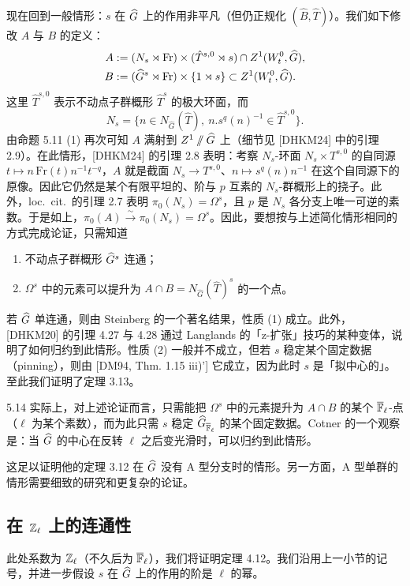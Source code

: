 现在回到一般情形：$s$ 在 $\widehat{G}$ 上的作用非平凡（但仍正规化 $(\hat B,\hat T)$）。我们如下修改 $A$ 与 $B$ 的定义：
\begin{align*}
A&:=(N_s\rtimes\mathrm{Fr})\times(\hat T^{s,0}\rtimes s)\cap Z^1(W_t^0,\widehat{G}),\\
B&:=(\widehat{G}^s\rtimes\mathrm{Fr})\times\{1\rtimes s\}\subset Z^1(W_t^0,\widehat{G}).
\end{align*}
这里 $\hat T^{s,0}$ 表示不动点子群概形 $\hat T^s$ 的极大环面，而
\[
N_s=\{n\in N_{\hat G}(\hat T),\ n.s^q(n)^{-1}\in\hat T^{s,0}\}.
\]
由命题 5.11 (1) 再次可知 $A$ 满射到 $Z^1\sslash\widehat{G}$ 上（细节见 [DHKM24] 中的引理 2.9）。在此情形，[DHKM24] 的引理 2.8 表明：考察 $N_s$-环面 $N_s\times T^{s,0}$ 的自同源 $t\mapsto n\,\mathrm{Fr}(t)n^{-1}t^{-q}$，$A$ 就是截面 $N_s\to T^{s,0}$、$n\mapsto s^q(n)n^{-1}$ 在这个自同源下的原像。因此它仍然是某个有限平坦的、阶与 $p$ 互素的 $N_s$-群概形上的挠子。此外，loc.\ cit.\ 的引理 2.7 表明 $\pi_0(N_s)=\Omega^s$，且 $p$ 是 $N_s$ 各分支上唯一可逆的素数。于是如上，$\pi_0(A)\xrightarrow{\sim}\pi_0(N_s)=\Omega^s$。因此，要想按与上述简化情形相同的方式完成论证，只需知道
\begin{enumerate}[leftmargin=2.2em,itemsep=0.1em,topsep=0.2em]
\item 不动点子群概形 $\widehat{G}^s$ 连通；
\item $\Omega^s$ 中的元素可以提升为 $A\cap B=N_{\hat G}(\hat T)^s$ 的一个点。
\end{enumerate}
若 $\widehat{G}$ 单连通，则由 Steinberg 的一个著名结果，性质 (1) 成立。此外，[DHKM20] 的引理 4.27 与 4.28 通过 Langlands 的「z-扩张」技巧的某种变体，说明了如何归约到此情形。性质 (2) 一般并不成立，但若 $s$ 稳定某个固定数据（pinning），则由 [DM94, Thm. 1.15 iii)'] 它成立，因为此时 $s$ 是「拟中心的」。至此我们证明了定理 3.13。

\begin{rem}{5.14}
实际上，对上述论证而言，只需能把 $\Omega^s$ 中的元素提升为 $A\cap B$ 的某个 $\overline{\mathbb{F}}_\ell$-点（$\ell$ 为某个素数），而为此只需 $s$ 稳定 $\widehat{G}_{\overline{\mathbb{F}}_\ell}$ 的某个固定数据。Cotner 的一个观察是：当 $\widehat{G}$ 的中心在反转 $\ell$ 之后变光滑时，可以归约到此情形。
\end{rem}

这足以证明他的定理 3.12 在 $\widehat{G}$ 没有 A 型分支时的情形。另一方面，A 型单群的情形需要细致的研究和更复杂的论证。

\subsection{在 $\mathbb{Z}_\ell$ 上的连通性}
此处系数为 $\mathbb{Z}_\ell$（不久后为 $\overline{\mathbb{F}}_\ell$），我们将证明定理 4.12。我们沿用上一小节的记号，并进一步假设 $s$ 在 $\widehat{G}$ 上的作用的阶是 $\ell$ 的幂。


